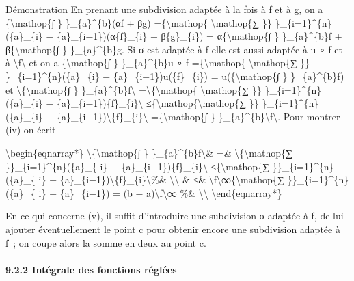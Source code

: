 \documentclass[]{article}
\begin{document}
Démonstration En prenant une subdivision adaptée à la fois à f et à g,
on a \{\textbackslash{}mathop\{∫ \} \}\_\{a\}\^{}\{b\}(αf + βg)
=\{\textbackslash{}mathop\{ \textbackslash{}mathop\{∑ \}\}
\}\_\{i=1\}\^{}\{n\}(\{a\}\_\{i\} − \{a\}\_\{i−1\})(α\{f\}\_\{i\} +
β\{g\}\_\{i\}) = α\{\textbackslash{}mathop\{∫ \} \}\_\{a\}\^{}\{b\}f +
β\{\textbackslash{}mathop\{∫ \} \}\_\{a\}\^{}\{b\}g. Si σ est adaptée à
f elle est aussi adaptée à u ∘ f et à
\textbackslash{}\textbar{}f\textbackslash{}\textbar{} et on a
\{\textbackslash{}mathop\{∫ \} \}\_\{a\}\^{}\{b\}u ∘ f
=\{\textbackslash{}mathop\{ \textbackslash{}mathop\{∑ \}\}
\}\_\{i=1\}\^{}\{n\}(\{a\}\_\{i\} − \{a\}\_\{i−1\})u(\{f\}\_\{i\}) =
u(\{\textbackslash{}mathop\{∫ \} \}\_\{a\}\^{}\{b\}f) et
\textbackslash{}\textbar{}\{\textbackslash{}mathop\{∫ \}
\}\_\{a\}\^{}\{b\}f\textbackslash{}\textbar{}
=\textbackslash{}\textbar{}\{\textbackslash{}mathop\{
\textbackslash{}mathop\{∑ \}\} \}\_\{i=1\}\^{}\{n\}(\{a\}\_\{i\} −
\{a\}\_\{i−1\})\{f\}\_\{i\}\textbackslash{}\textbar{}
≤\{\textbackslash{}mathop\{\textbackslash{}mathop\{∑ \}\}
\}\_\{i=1\}\^{}\{n\}(\{a\}\_\{i\} −
\{a\}\_\{i−1\})\textbackslash{}\textbar{}\{f\}\_\{i\}\textbackslash{}\textbar{}
=\{\textbackslash{}mathop\{∫ \}
\}\_\{a\}\^{}\{b\}\textbackslash{}\textbar{}f\textbackslash{}\textbar{}.
Pour montrer (iv) on écrit

\textbackslash{}begin\{eqnarray*\}
\textbackslash{}\textbar{}\{\textbackslash{}mathop\{∫ \}
\}\_\{a\}\^{}\{b\}f\textbackslash{}\textbar{}\& =\&
\textbackslash{}\textbar{}\{\textbackslash{}mathop\{∑
\}\}\_\{i=1\}\^{}\{n\}(\{a\}\_\{ i\} −
\{a\}\_\{i−1\})\{f\}\_\{i\}\textbackslash{}\textbar{}
≤\{\textbackslash{}mathop\{∑ \}\}\_\{i=1\}\^{}\{n\}(\{a\}\_\{ i\} −
\{a\}\_\{i−1\})\textbackslash{}\textbar{}\{f\}\_\{i\}\textbackslash{}\textbar{}\%\&
\textbackslash{}\textbackslash{} \& ≤\&
\textbackslash{}\textbar{}f\textbackslash{}\textbar{}∞\{\textbackslash{}mathop\{∑
\}\}\_\{i=1\}\^{}\{n\}(\{a\}\_\{ i\} − \{a\}\_\{i−1\}) = (b −
a)\textbackslash{}\textbar{}f\textbackslash{}\textbar{}∞ \%\&
\textbackslash{}\textbackslash{} \textbackslash{}end\{eqnarray*\}

En ce qui concerne (v), il suffit d'introduire une subdivision σ adaptée
à f, de lui ajouter éventuellement le point c pour obtenir encore une
subdivision adaptée à f~; on coupe alors la somme en deux au point c.

\paragraph{9.2.2 Intégrale des fonctions réglées}
\end{document}
